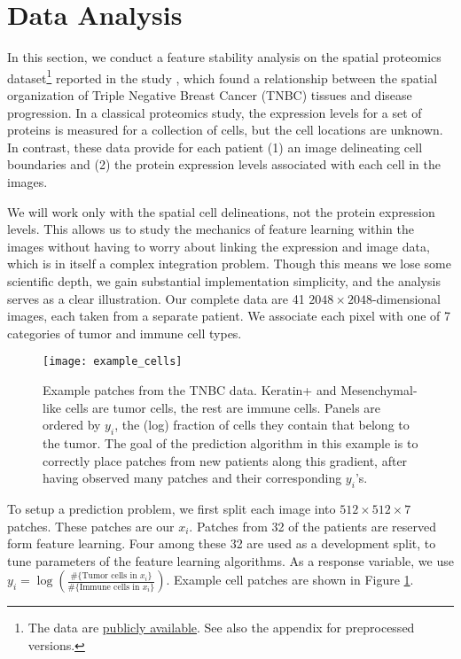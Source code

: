
\section{Data Analysis}
\label{sec:dataset}

In this section, we conduct a feature stability analysis on the spatial
proteomics dataset\footnote{The data are
  \href{https://www.angelolab.com/mibi-data}{publicly available}. See also the
  appendix for preprocessed versions.} reported in the study
\citep{keren2018structured}, which found a relationship between the spatial
organization of Triple Negative Breast Cancer (TNBC) tissues and disease
progression. In a classical proteomics study, the expression levels for a set of
proteins is measured for a collection of cells, but the cell locations are
unknown. In contrast, these data provide for each patient (1) an image
delineating cell boundaries and (2) the protein expression levels associated
with each cell in the images.

We will work only with the spatial cell delineations, not the protein expression
levels. This allows us to study the mechanics of feature learning within the
images without having to worry about linking the expression and image data,
which is in itself a complex integration problem. Though this means we lose some
scientific depth, we gain substantial implementation simplicity, and the
analysis serves as a clear illustration. Our complete data are 41 $2048 \times
2048$-dimensional images, each taken from a separate patient. We associate each
pixel with one of 7 categories of tumor and immune cell types.

\begin{figure}
  \centering
  \texttt{[image: example\_cells]}
  \caption{Example patches from the TNBC data. Keratin+ and Mesenchymal-like
    cells are tumor cells, the rest are immune cells. Panels are ordered by
    $y_i$, the (log) fraction of cells they contain that belong to the tumor.
    The goal of the prediction algorithm in this example is to correctly place
    patches from new patients along this gradient, after having observed many
    patches and their corresponding $y_i$'s.}
  \label{fig:example_cells}
\end{figure}

To setup a prediction problem, we first split each image into $512 \times 512 \times 7$
patches. These patches are our $x_{i}$. Patches from 32 of the patients are
reserved form feature learning. Four among these 32 are used as a development
split, to tune parameters of the feature learning algorithms. As a response
variable, we use $y_{i} = \log\left(\frac{\#\{\text{Tumor cells in
  }x_{i}\}}{\#\{\text{Immune cells in }x_i\}}\right)$. Example cell patches are
shown in Figure \ref{fig:example_cells}.

